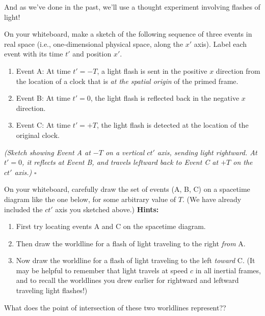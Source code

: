 \documentclass[11pt, letterpaper, openany]{book}
\newenvironment{exercise}[1][Exercise]{%
  \tcolorbox[blanker, breakable, left=1em,
    before skip=1em, after skip=1em,
    borderline west={3pt}{0pt}{PhysNavy},
    colback=PhysCream,
    before upper={\textcolor{PhysNavy}{\sffamily\bfseries #1:}\space}
  ]%
}{%
  \endtcolorbox%
}
\newenvironment{solution}[1][Solution]{%
  \tcolorbox[blanker, breakable, left=1em,
    before skip=1em, after skip=1em,
    borderline west={2pt}{0pt}{PhysTeal},
    colback=PhysCream,
    before upper={\textcolor{PhysTeal}{\sffamily\bfseries #1.}\space}
  ]%
}{%
  \hfill\textcolor{PhysTeal}{\ensuremath{\square}}\endtcolorbox%
}
\begin{document}
And as we've done in the past, we'll use a thought experiment involving flashes of light!

\begin{exercise}[Exercise 5]
On your whiteboard, make a sketch of the following sequence of three events in real space (i.e., one-dimensional physical space, along the $x'$ axis). Label each event with its time $t'$ and position $x'$.
\begin{enumerate}[label=(\alph*)]
    \item Event A: At time $t' = -T$, a light flash is sent in the positive $x$ direction from the location of a clock that is \textit{at the spatial origin} of the primed frame.
    \item Event B: At time $t' = 0$, the light flash is reflected back in the negative $x$ direction.
    \item Event C: At time $t' = +T$, the light flash is detected at the location of the original clock.
\end{enumerate}
\end{exercise}

\begin{solution}
\textit{(Sketch showing Event A at $-T$ on a vertical $ct'$ axis, sending light rightward. At $t'=0$, it reflects at Event B, and travels leftward back to Event C at $+T$ on the $ct'$ axis.)}
\end{solution}

\begin{exercise}[Exercise 6]
On your whiteboard, carefully draw the set of events (A, B, C) on a spacetime diagram like the one below, for some arbitrary value of $T$. (We have already included the $ct'$ axis you sketched above.) \textbf{Hints:}
\begin{enumerate}[label=(\alph*)]
    \item First try locating events A and C on the spacetime diagram.
    \item Then draw the worldline for a flash of light traveling to the right \textit{from} A.
    \item Now draw the worldline for a flash of light traveling to the left \textit{toward} C. (It may be helpful to remember that light travels at speed $c$ in all inertial frames, and to recall the worldlines you drew earlier for rightward and leftward traveling light flashes!)
\end{enumerate}
What does the point of intersection of these two worldlines represent??
\end{exercise}
\end{document}
